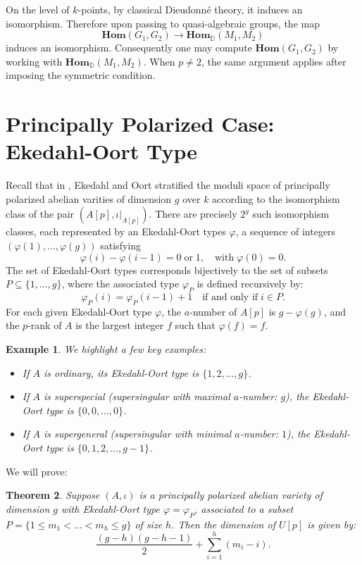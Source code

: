 \documentclass[a4paper,12pt,twoside]{report}
\newtheorem{theorem}{Theorem}[section]
\newtheorem{example}[theorem]{Example}
\begin{document}
On the level of \(k\)-points, by classical Dieudonné theory, it induces an isomorphism. 
Therefore upon passing to quasi-algebraic groups, the map 
\[\mathbf{Hom}(G_1,G_2)\rightarrow \mathbf{Hom}_{\mathbb{D}}(M_1,M_2)\]
induces an isomorphism. 
Consequently one may compute \(\mathbf{Hom}(G_1,G_2)\) by working with \(\mathbf{Hom}_{\mathbb{D}}(M_1,M_2)\). 
When \(p\neq 2\), the same argument applies after imposing the symmetric condition. 

\section{Principally Polarized Case: Ekedahl-Oort Type}

Recall that in \cite{Oo1}, Ekedahl and Oort stratified the moduli space of 
principally polarized abelian varities of dimension $g$ over $k$ 
according to the isomorphism class of the pair $(A[p],\iota|_{A[p]})$. 
There are precisely $2^g$ such isomorphism classes, 
each represented by an Ekedahl-Oort types $\varphi$, 
a sequence of integers $(\varphi(1),...,\varphi(g))$ satisfying 
\[\varphi(i)-\varphi(i-1)=0 \;\text{or} \;1,\quad \text{with}\;\varphi(0)=0.\]
The set of Ekedahl-Oort types corresponds bijectively to the set of subsets $P\subseteq \{1,...,g\}$, 
where the associated type $\varphi_P$ is defined recursively by: \[\varphi_P(i)=\varphi_P(i-1)+1 \quad \text{if and only if}\; i\in P.\]
For each given Ekedahl-Oort type $\varphi$, 
the $a$-number of $A[p]$ is $g-\varphi(g)$, and the $p$-rank of $A$ is the largest integer $f$ such that $\varphi(f)=f$. 

\begin{example} We highlight a few key examples: 
    \begin{itemize}
        \item If $A$ is ordinary, its Ekedahl-Oort type is $\{1,2,...,g\}$. 
        \item If $A$ is superspecial (supersingular with maximal $a$-number: $g$), the Ekedahl-Oort type is $\{0,0,...,0\}$. 
        \item If $A$ is supergeneral (supersingular with minimal $a$-number: $1$), the Ekedahl-Oort type is $\{0,1,2,...,g-1\}$. 
    \end{itemize}
\end{example}

We will prove: 
\begin{theorem} \label{E-O}
    Suppose $(A,\iota)$ is a principally polarized abelian variety of dimension $g$ 
    with Ekedahl-Oort type $\varphi=\varphi_P$, associated to a subset 
    $P=\{1\leqslant m_1<...<m_h\leqslant g\}$ of size $h$. 
    Then the dimension of $U[p]$ is given by: 
    \[\frac{(g-h)(g-h-1)}{2}+\sum_{i=1}^{h}(m_i-i).\]
\end{theorem}
\end{document}
